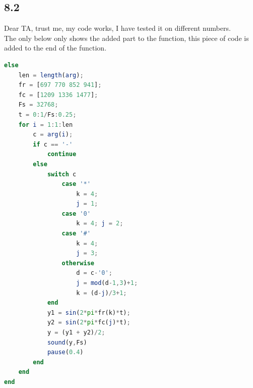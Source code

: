 \documentclass[11pt]{article} %
\begin{document}
\subsection{8.2}
Dear TA, trust me, my code works, I have tested it on different numbers.\\
The only below only shows the added part to the function, this piece of code is added to the end of the function.
\begin{lstlisting}[language=Octave, basicstyle=\ttfamily]
else
    len = length(arg);
    fr = [697 770 852 941];
    fc = [1209 1336 1477];
    Fs = 32768;
    t = 0:1/Fs:0.25;
    for i = 1:1:len
        c = arg(i);
        if c == '-'
            continue
        else
            switch c
                case '*'
                    k = 4; 
                    j = 1;
                case '0'
                    k = 4; j = 2;
                case '#'
                    k = 4; 
                    j = 3;
                otherwise
                    d = c-'0'; 
                    j = mod(d-1,3)+1; 
                    k = (d-j)/3+1;
            end
            y1 = sin(2*pi*fr(k)*t);
            y2 = sin(2*pi*fc(j)*t);
            y = (y1 + y2)/2;
            sound(y,Fs)
            pause(0.4)
        end
    end
end

\end{lstlisting}
\end{document}
